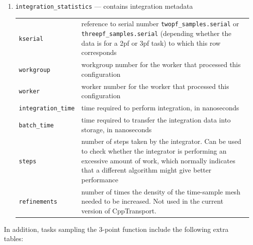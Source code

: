 \documentclass[11pt,a4paper]{article}
\newcommand{\packagefont}{\sffamily}
\newcommand{\CppTransport}{{\packagefont CppTransport}}
\newenvironment{sqltablelist}{\renewcommand{\arraystretch}{1.3}\small}{}
\begin{document}
\begin{sqltablelist}
\begin{enumerate}
    \item \texttt{integration_statistics} --- contains integration metadata \\
    \label{sqltables:statistics}
    \begin{tabular}{p{2.5cm}p{11.2cm}}
        \texttt{kserial} & reference to serial number
        \texttt{twopf_samples.serial} or
        \texttt{threepf_samples.serial} (depending whether the data is for
        a 2pf or 3pf task) to which this row corresponds \\
        \texttt{workgroup} & workgroup number for the worker that processed this configuration \\
        \texttt{worker} & worker number for the worker that processed this configuration \\
        \texttt{integration_time} & time required to perform integration, in nanoseconds \\
        \texttt{batch_time} & time required to transfer the integration data into storage, in nanoseconds \\
        \texttt{steps} & number of steps taken by the integrator. Can be used to check whether
        the integrator is performing an excessive amount of work, which normally indicates that a different
        algorithm might give better performance \\
        \texttt{refinements} & number of times the density of the time-sample mesh needed to be
        increased. Not used in the current version of {\CppTransport}.
    \end{tabular}
\end{enumerate}
\end{sqltablelist}
In addition, tasks sampling the 3-point function include the following extra tables:
\end{document}
